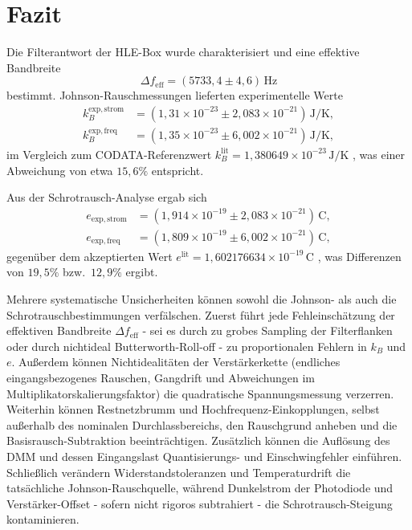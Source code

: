 \chapter{Fazit}
Die Filterantwort der HLE-Box wurde charakterisiert und eine effektive Bandbreite
\begin{equation*}
  \Delta f_{\mathrm{eff}} = (5733{,}4 \pm 4{,}6)\,\mathrm{Hz}
\end{equation*}
bestimmt. Johnson-Rauschmessungen lieferten experimentelle Werte
\begin{equation*}
  \begin{aligned}
    k_B^{\mathrm{exp,strom}} &= (1{,}31\times10^{-23} \pm 2{,}083\times10^{-21})\,\mathrm{J/K},\\
    k_B^{\mathrm{exp,freq}}  &= (1{,}35\times10^{-23} \pm 6{,}002\times10^{-21})\,\mathrm{J/K},
  \end{aligned}
\end{equation*}
im Vergleich zum CODATA-Referenzwert $k_B^{\mathrm{lit}} = 1{,}380649\times10^{-23}\,\mathrm{J/K}$ \cite{codata}, was einer Abweichung von etwa $15{,}6\%$ entspricht.

Aus der Schrotrausch-Analyse ergab sich
\begin{equation*}
  \begin{aligned}
    e_{\mathrm{exp,strom}} &= (1{,}914\times10^{-19} \pm 2{,}083\times10^{-21})\,\mathrm{C},\\
    e_{\mathrm{exp,freq}}  &= (1{,}809\times10^{-19} \pm 6{,}002\times10^{-21})\,\mathrm{C},
  \end{aligned}
\end{equation*}
gegenüber dem akzeptierten Wert $e^{\mathrm{lit}} = 1{,}602176634\times10^{-19}\,\mathrm{C}$ \cite{codata}, was Differenzen von $19{,}5\%$ bzw.\ $12{,}9\%$ ergibt.


Mehrere systematische Unsicherheiten können sowohl die Johnson- als auch die Schrotrauschbestimmungen verfälschen. 
Zuerst führt jede Fehleinschätzung der effektiven Bandbreite $\Delta f_{\mathrm{eff}}$ - sei es durch zu grobes Sampling der Filterflanken oder durch nichtideal Butterworth-Roll-off - zu proportionalen Fehlern in $k_B$ und $e$. 
Außerdem können Nichtidealitäten der Verstärkerkette (endliches eingangsbezogenes Rauschen, Gangdrift und Abweichungen im Multiplikatorskalierungsfaktor) die quadratische Spannungsmessung verzerren. 
Weiterhin können Restnetzbrumm und Hochfrequenz-Einkopplungen, selbst außerhalb des nominalen Durchlassbereichs, den Rauschgrund anheben und die Basisrausch-Subtraktion beeinträchtigen. 
Zusätzlich können die Auflösung des DMM und dessen Eingangslast Quantisierungs- und Einschwingfehler einführen. 
Schließlich verändern Widerstandstoleranzen und Temperaturdrift die tatsächliche Johnson-Rauschquelle, während Dunkelstrom der Photodiode und Verstärker-Offset - sofern nicht rigoros subtrahiert - die Schrotrausch-Steigung kontaminieren.

